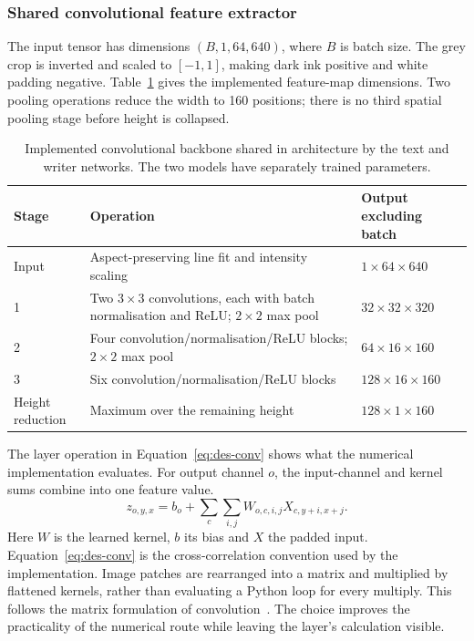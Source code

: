\subsubsection{Shared convolutional feature extractor}
The input tensor has dimensions $(B,1,64,640)$, where $B$ is batch size. The grey crop is inverted and scaled to $[-1,1]$, making dark ink positive and white padding negative. Table~\ref{tab:des-backbone} gives the implemented feature-map dimensions. Two pooling operations reduce the width to 160 positions; there is no third spatial pooling stage before height is collapsed.
\begin{table}[!htbp]\centering\small
\begin{tabularx}{\linewidth}{|l|X|l|}
\hline\textbf{Stage}&\textbf{Operation}&\textbf{Output excluding batch}\\\hline
Input&Aspect-preserving line fit and intensity scaling&$1\times64\times640$\\\hline
1&Two $3\times3$ convolutions, each with batch normalisation and ReLU; $2\times2$ max pool&$32\times32\times320$\\\hline
2&Four convolution/normalisation/ReLU blocks; $2\times2$ max pool&$64\times16\times160$\\\hline
3&Six convolution/normalisation/ReLU blocks&$128\times16\times160$\\\hline
Height reduction&Maximum over the remaining height&$128\times1\times160$\\\hline
\end{tabularx}
\caption{Implemented convolutional backbone shared in architecture by the text and writer networks. The two models have separately trained parameters.}
\label{tab:des-backbone}
\end{table}

The layer operation in Equation~\ref{eq:des-conv} shows what the numerical implementation evaluates. For output channel $o$, the input-channel and kernel sums combine into one feature value.
\begin{equation}
z_{o,y,x}=b_o+\sum_c\sum_{i,j}W_{o,c,i,j}X_{c,y+i,x+j}.
\label{eq:des-conv}
\end{equation}
Here $W$ is the learned kernel, $b$ its bias and $X$ the padded input. Equation~\ref{eq:des-conv} is the cross-correlation convention used by the implementation. Image patches are rearranged into a matrix and multiplied by flattened kernels, rather than evaluating a Python loop for every multiply. This follows the matrix formulation of convolution~\cite{chellapilla2006}. The choice improves the practicality of the numerical route while leaving the layer's calculation visible.


